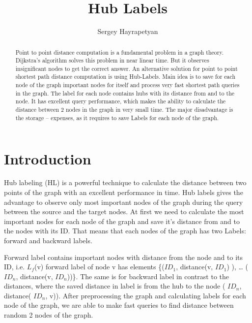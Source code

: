 \documentclass[english,draft]{article}
\author{Sergey Hayrapetyan}
\title{Hub Labels}
\begin{document}
\maketitle





\setcounter{page}{1}


\begin{abstract}



Point to point distance computation is a fundamental problem in a graph theory.
Dijkstra’s algorithm solves this problem in near linear time.
But it observes insignificant nodes to get the correct answer.
An alternative solution for point to point shortest path distance computation is using Hub-Labels.
Main idea is to save for each node of the graph important nodes for itself and process very fast shortest path queries in the graph.
The label for each node contains hubs with its distance from and to the node.
It has excellent query performance, which makes the ability to calculate the distance between 2 nodes in the graph in very small time.
The major disadvantage is the storage – expenses, as it requires to save Labels for each node of the graph.
\end{abstract}

\section{Introduction}



Hub labeling (HL) is a powerful technique to calculate the distance between two points of the graph with an excellent performance in time.
Hub labels gives the advantage to observe only most important nodes of the graph during the query between the source and the target nodes.
At first we need to calculate the most important nodes for each node of the graph and save it’s distance from and to the nodes with its ID.
That means that each nodes of the graph has two Labels: forward and backward labels.

Forward label contains important nodes with distance from the node and to its ID, i.e.  ${L}_{f}$(v) forward label of node v has elements \{(${ID}_{1}$, distance(v, ${ID}_{1}$) ), … (${ID}_{n}$, distance(v, ${ID}_{n}$))\}.
The same is for backward label in contrast to the distances, where the saved distance in label is from the hub to the node ( ${ID}_{n}$, distance( ${ID}_{n}$, v)). 
After preprocessing the graph and calculating labels for each node of the graph, we are able to make fast queries to find distance between random 2 nodes of the graph.
\end{document}
